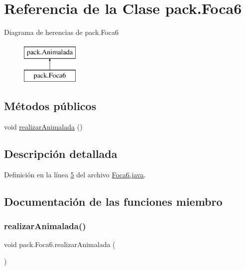 \hypertarget{classpack_1_1_foca6}{}\section{Referencia de la Clase pack.\+Foca6}
\label{classpack_1_1_foca6}
Diagrama de herencias de pack.\+Foca6\begin{figure}[H]
\begin{center}
\leavevmode
\includegraphics[height=2.000000cm]{classpack_1_1_foca6}
\end{center}
\end{figure}
\subsection*{Métodos públicos}
\begin{DoxyCompactItemize}
\item 
void \mbox{\hyperlink{classpack_1_1_foca6_a89a4181a4ff16b38a388e08d8bd68f8f}{realizar\+Animalada}} ()
\end{DoxyCompactItemize}


\subsection{Descripción detallada}


Definición en la línea \mbox{\hyperlink{_foca6_8java_source_l00005}{5}} del archivo \mbox{\hyperlink{_foca6_8java_source}{Foca6.\+java}}.



\subsection{Documentación de las funciones miembro}
\mbox{\label{classpack_1_1_foca6_a89a4181a4ff16b38a388e08d8bd68f8f}} 
\subsubsection{\texorpdfstring{realizarAnimalada()}{realizarAnimalada()}}
{\footnotesize\ttfamily void pack.\+Foca6.\+realizar\+Animalada (\begin{DoxyParamCaption}{ }\end{DoxyParamCaption})}

